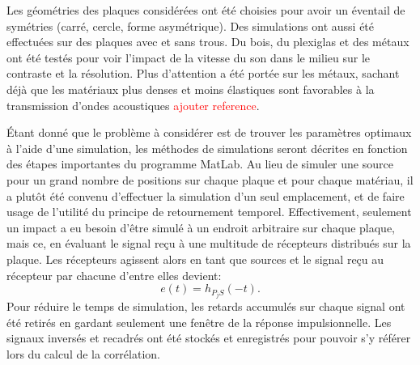 \documentclass[conference]{IEEEtran}
\begin{document}

Les géométries des plaques considérées ont été choisies pour avoir un éventail de 
symétries (carré, cercle, forme asymétrique). Des simulations ont aussi été effectuées 
sur des plaques avec et sans trous. Du bois, du plexiglas et des métaux 
ont été testés pour voir l'impact de la vitesse du son dans le milieu sur
le contraste et la résolution. Plus d'attention a été portée sur les métaux,
sachant déjà que les matériaux plus denses et moins élastiques sont favorables à 
la transmission d'ondes acoustiques \textcolor{red}{ajouter reference}.

Étant donné que le problème à considérer est de trouver les paramètres 
optimaux à l'aide d'une simulation, les méthodes de simulations seront décrites
en fonction des étapes importantes du programme MatLab. Au lieu de simuler une source
pour un grand nombre de positions sur chaque plaque et pour chaque matériau, il a plutôt
été convenu d'effectuer la simulation d'un seul emplacement, et de faire usage de l'utilité
du principe de retournement temporel. Effectivement, seulement un impact a eu besoin
d'être simulé à un endroit arbitraire sur chaque plaque, mais ce, en évaluant le signal reçu
à une multitude de récepteurs distribués sur la plaque. Les récepteurs agissent alors en tant
que sources et le signal reçu au récepteur par chacune d'entre elles devient:
\[e(t)=h_{P_jS}(-t).\]
Pour réduire le temps de simulation, les retards accumulés sur chaque signal ont été 
retirés en gardant seulement une fenêtre de la réponse impulsionnelle. Les signaux inversés et 
recadrés ont été stockés et enregistrés pour pouvoir s'y référer lors du calcul de la corrélation.


\end{document}
